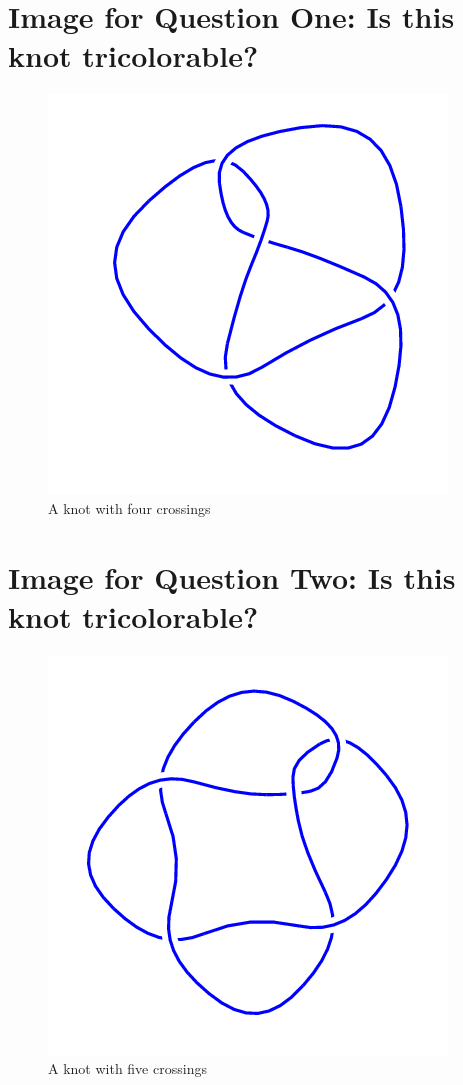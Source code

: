 \documentclass[12pt,letterpaper]{article}
\theoremstyle{definition}
\begin{document}
\setlength{\parskip}{1ex plus 0.5ex minus 0.2ex}
\setlength{\parindent}{0pt}

\pagestyle{fancy}
\cfoot{}

\section*{Image for Question One: Is this knot tricolorable?}

\begin{figure}[h]
    \centering
    \includegraphics[width=.45\textwidth]{meeting09pics/4_1.png}
    \caption{A knot with four crossings}
\end{figure}

\section*{Image for Question Two: Is this knot tricolorable?}

\begin{figure}[h]
    \centering
    \includegraphics[width=.45\textwidth]{meeting09pics/5_2mirror.png}
    \caption{A knot with five crossings}
\end{figure}
\end{document}
